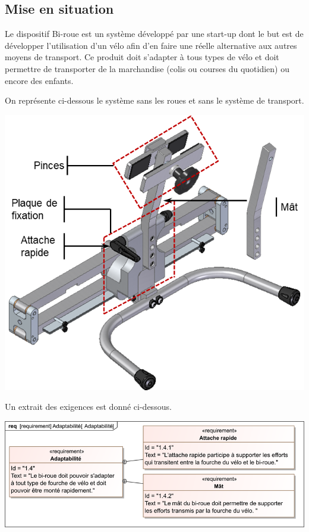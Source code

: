 \documentclass[10pt,fleqn]{article} %
\begin{document}

\vspace{4.5cm}
\pagestyle{fancy}
\thispagestyle{plain}


\def\columnseprulecolor{\color{ocre}}
\setlength{\columnseprule}{0.4pt} 

\begin{multicols}{2}
\section*{Mise en situation}
Le dispositif Bi-roue est un système développé par une start-up dont le but est de développer l’utilisation d’un vélo afin d’en faire une réelle alternative aux autres moyens de transport. Ce produit doit s’adapter à tous types de vélo et doit permettre de transporter de la marchandise (colis ou courses du quotidien) ou encore des enfants.

On représente ci-dessous le système sans les roues et sans le système de transport. 

\begin{center}
\includegraphics[width=\linewidth]{images/fig_02}
\end{center}


Un extrait des exigences est donné ci-dessous.
\begin{center}
\includegraphics[width=\linewidth]{images/fig_06}
\end{center}




\end{multicols}
\end{document}
